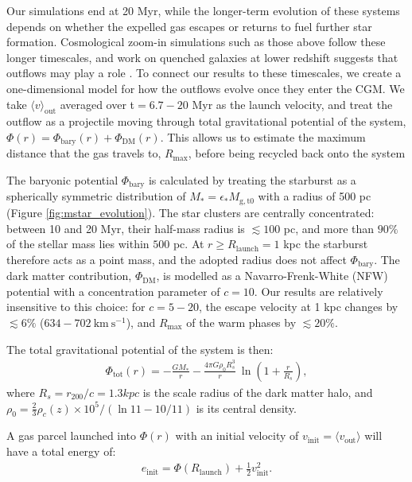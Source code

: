 \documentclass[twocolumn,linenumbers]{aastex631}
\begin{document}
Our simulations end at 20 Myr, while the longer-term evolution of these systems depends on whether the expelled gas escapes or returns to fuel further star formation. Cosmological zoom-in simulations such as those above follow these longer timescales, and work on quenched galaxies at lower redshift suggests that outflows may play a role \citep{2015ARA&A..53...51S,2024ApJ...964...76G}. To connect our results to these timescales, we create a one-dimensional model for how the outflows evolve once they enter the CGM. We take $\langle v\rangle _\mathrm{out}$ averaged over t$ =6.7 - 20$ Myr as the launch velocity, and treat the outflow as a projectile moving through total gravitational potential of the system, $\Phi (r) = \Phi_\mathrm{bary}(r) + \Phi_\mathrm{DM}(r)$. This allows us to estimate the maximum distance that the gas travels to, $R_\mathrm{max}$, before being recycled back onto the system 

The baryonic potential $\Phi_\mathrm{bary}$ is calculated by treating the starburst as a spherically symmetric distribution of $M_* = \epsilon_* M_\mathrm{g,t0}$ with a radius of 500 pc (Figure \ref{fig:mstar_evolution}). The star clusters are centrally concentrated: between 10 and 20 Myr, their half-mass radius is $\lesssim 100$ pc, and more than $90\%$ of the stellar mass lies within $500$ pc. At $r \geq R_\mathrm{launch} = 1$ kpc the starburst therefore acts as a point mass, and the adopted radius does not affect $\Phi_\mathrm{bary}$. The dark matter contribution, $\Phi_\mathrm{DM}$, is modelled as a Navarro-Frenk-White (NFW) potential \citep{1997ApJ...490..493N} with a concentration parameter of $c=10$. Our results are relatively insensitive to this choice: for $c = 5-20$, the escape velocity at 1 kpc changes by $\lesssim 6\%$ ($634-702\ \mathrm{km\ s^{-1}}$), and $R_\mathrm{max}$ of the warm phases by $\lesssim 20\%$. 

The total gravitational potential of the system is then: 
\begin{align}
\Phi_\mathrm{tot}(r) = - \frac{G M_*}{r} - \frac{4\pi G \rho_0 R_s^3}{r}\ \ln\left(1 + \frac{r}{R_s}\right),
\end{align}
where $R_s = r_{200}/c = 1.3kpc$ is the scale radius of the dark matter halo, and $\rho_0 = \frac{2}{3}\rho_c(z) \times 10^5 /(\ln 11 - 10/11)$ is its central density.

A gas parcel launched into $\Phi (r)$ with an initial velocity of $v_\mathrm{init} = \langle v_\mathrm{out} \rangle$ will have a total energy of:
\begin{align}
e_\mathrm{init} = \Phi(R_\mathrm{launch}) + \frac{1}{2}v_\mathrm{init}^2.
\end{align}
\end{document}
